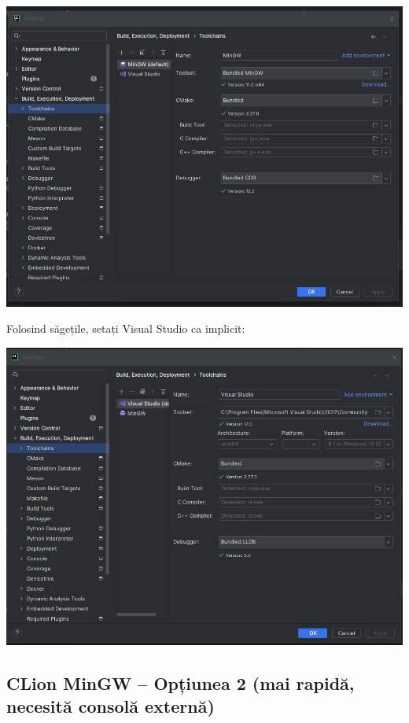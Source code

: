 \documentclass[../ro-fa-lab.tex]{subfiles}
\begin{document}
\includegraphics[width=\textwidth,alt={A screenshot of a computer Description automatically generated}]{./Resources/tutorial_lab9/image20.png}

Folosind săgețile, setați Visual Studio ca implicit:

\includegraphics[width=\textwidth,alt={A screenshot of a computer Description automatically generated}]{./Resources/tutorial_lab9/image21.png}

\subsection{CLion MinGW – Opțiunea 2 (mai rapidă, necesită consolă externă)}\label{clion-mingw-option-2-faster-requires-external-console}
\end{document}
